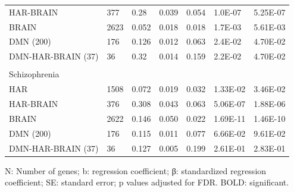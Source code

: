 \begin{refsection}
\begin{table}[H]
\begin{tabular}{@{}lllllll@{}}
HAR-BRAIN                         & 377  & 0.28   & 0.039  & 0.054 & 1.0E-07  & 5.25E-07   \\
BRAIN                             & 2623 & 0.052  & 0.018  & 0.018 & 1.7E-03  & 5.61E-03   \\
DMN (200)                         & 176  & 0.126  & 0.012  & 0.063 & 2.4E-02  & 4.70E-02   \\
DMN-HAR-BRAIN (37)                & 36   & 0.32   & 0.014  & 0.159 & 2.2E-02  & 4.70E-02   \\
                                  &      &        &        &       &          &            \\
Schizophrenia                     &      &        &        &       &          &            \\
HAR                               & 1508 & 0.072  & 0.019  & 0.032 & 1.33E-02 & 3.46E-02   \\
HAR-BRAIN                         & 376  & 0.308  & 0.043  & 0.063 & 5.06E-07 & 1.88E-06   \\
BRAIN                             & 2622 & 0.146  & 0.050  & 0.022 & 1.69E-11 & 1.46E-10   \\
DMN (200)                         & 176  & 0.115  & 0.011  & 0.077 & 6.66E-02 & 9.61E-02   \\
DMN-HAR-BRAIN (37)                & 36   & 0.127  & 0.005  & 0.199 & 2.61E-01 & 2.83E-01   \\ \hline
\end{tabular}
N: Number of genes; b: regression coefficient; β: standardized regression coefficient; SE: standard error; p values adjusted for FDR. BOLD: significant.
\end{table}



\end{refsection}
